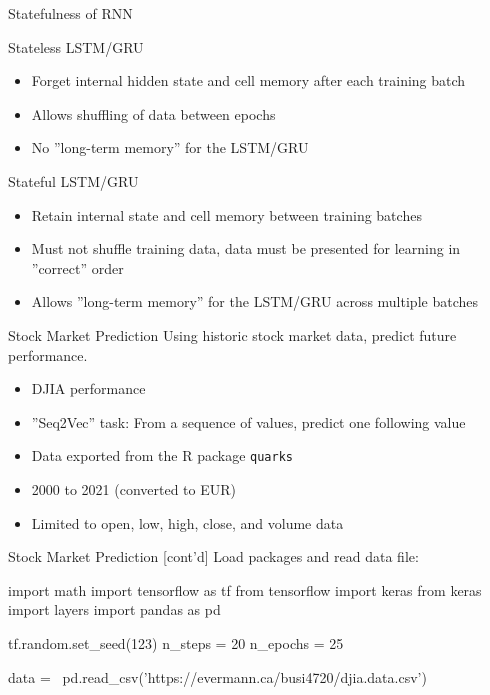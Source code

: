 \documentclass[ignorenonframetext,xcolor=x11names]{beamer}
\begin{document}
\begin{frame}[label=full]{Statefulness of RNN}
\small
\begin{block}{Stateless LSTM/GRU}
\begin{itemize}
   \item Forget internal hidden state and cell memory after each training batch
   \item Allows shuffling of data between epochs
   \item No ''long-term memory'' for the LSTM/GRU
\end{itemize}
\end{block}
\begin{block}{Stateful LSTM/GRU}
\begin{itemize}
   \item Retain internal state and cell memory between training batches
   \item Must not shuffle training data, data must be presented for learning in ''correct'' order
   \item Allows ''long-term memory'' for the LSTM/GRU across multiple batches
\end{itemize}
\end{block}
\end{frame}


\begin{frame}[label=withcode,fragile]{Stock Market Prediction}
Using historic stock market data, predict future performance.
\begin{itemize}
   \item DJIA performance
   \item ''Seq2Vec'' task: From a sequence of values, predict one following value
   \item Data exported from the R package \texttt{quarks}
   \item 2000 to 2021 (converted to EUR)
   \item Limited to open, low, high, close, and volume data
\end{itemize}
\end{frame}

\begin{frame}[label=withcode,fragile]{Stock Market Prediction \small [cont'd]}
Load packages and read data file:
\begin{pythoncode}
import math
import tensorflow as tf
from tensorflow import keras
from keras import layers
import pandas as pd

tf.random.set_seed(123)
n_steps = 20
n_epochs = 25

data = \
pd.read_csv('https://evermann.ca/busi4720/djia.data.csv')
\end{pythoncode}
\end{frame}
\end{document}
